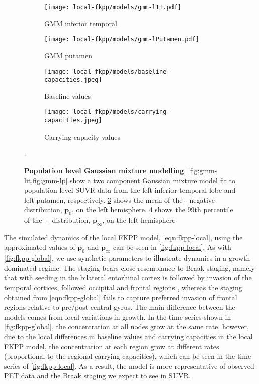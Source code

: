\begin{figure}[H]
    \centering
    \begin{subfigure}{0.45\textwidth}
        \centering
        \texttt{[image: local-fkpp/models/gmm-lIT.pdf]}
        \caption{GMM inferior temporal}
        \label{fig:gmm-lit}
    \end{subfigure}
    \begin{subfigure}{0.45\textwidth}
        \centering
        \texttt{[image: local-fkpp/models/gmm-lPutamen.pdf]}
        \caption{GMM putamen}
        \label{fig:gmm-lp}
    \end{subfigure}
    
    \begin{subfigure}{0.95\textwidth}
        \centering
        \texttt{[image: local-fkpp/models/baseline-capacities.jpeg]}
        \caption{Baseline values}
        \label{fig:baseline-capacities}
    \end{subfigure}
    
    \begin{subfigure}{0.95\textwidth}
        \centering
        \texttt{[image: local-fkpp/models/carrying-capacities.jpeg]}
        \caption{Carrying capacity values}
        \label{fig:carrying-capacities}
    \end{subfigure}

    \caption{\textbf{Population level Gaussian mixture modelling}.
    \cref{fig:gmm-lit,fig:gmm-lp} show a two component Gaussian mixture
    model fit to population level SUVR data from the left inferior temporal lobe
    and left putamen, respectively. \cref{fig:baseline-capacities} shows the mean
    of the \TP- negative distribution, $\mathbf{p}_{0}$, on the left hemisphere. 
    \cref{fig:carrying-capacities} shows the 99th percentile of the \TP+ 
    distribution, $\mathbf{p}_\infty$, on the left hemisphere}
    \label{fig:gmm}.
\end{figure}

The simulated dynamics of the local FKPP model, \cref{eqn:fkpp-local}, using the
approximated values of $\mathbf{p}_{0}$ and $\mathbf{p}_\infty$ can be seen in
\cref{fig:fkpp-local}. As with \cref{fig:fkpp-global}, we use synthetic
parameters to illustrate dynamics in a growth dominated regime. The staging
bears close resemblance to Braak staging, namely that with seeding in the
bilateral entorhinal cortex is followed by invasion of the temporal cortices,
followed occipital and frontal regions \cite{cho2016vivo, SCHOLL2016971},
whereas the staging obtained from \cref{eqn:fkpp-global} fails to capture
preferred invasion of frontal regions relative to pre/post central gyrus. The
main difference between the models comes from local variations in growth. In the
time series shown in \cref{fig:fkpp-global}, the concentration at all nodes grow
at the same rate, however, due to the local differences in baseline values and
carrying capacities in the local FKPP model, the concentration at each region
grow at different rates (proportional to the regional carrying capacities),
which can be seen in the time series of \cref{fig:fkpp-local}. As a result, the
model is more representative of observed PET data and the Braak staging we
expect to see in \TP SUVR.

